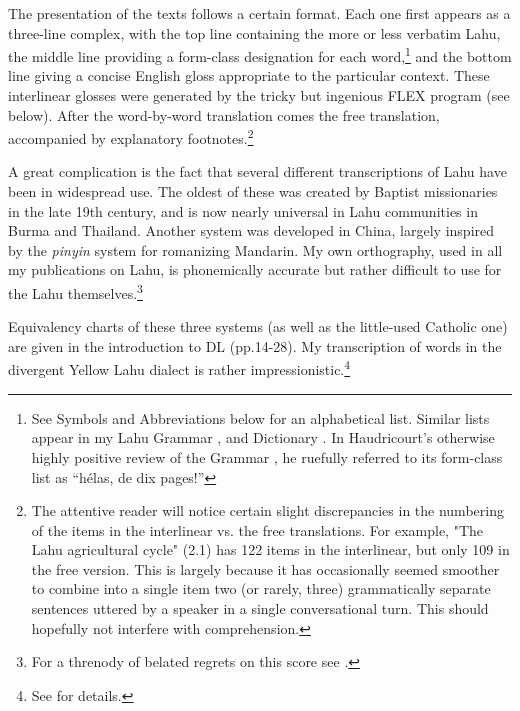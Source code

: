 The presentation of the texts follows a certain format. Each one first
appears as a three-line complex, with the top line containing the more
or less verbatim Lahu, the middle line providing a form-class
designation for each word,\footnote{See Symbols and Abbreviations
  below for an alphabetical list. Similar lists appear in my Lahu
  Grammar \citep[pp. xxviii- xxxvii]{matisoff1973grammar}, and
  Dictionary \citep[pp. xxi-xxiv]{88}. In Haudricourt's otherwise
  highly positive review of the Grammar \citep{h74}, he ruefully
  referred to its form-class list as ``hélas, de dix pages!''}  and
the bottom line giving a concise English gloss appropriate to the
particular context. These interlinear glosses were generated by the
tricky but ingenious FLEX program (see below). After the word-by-word
translation comes the free translation, accompanied by explanatory
footnotes.\footnote{
The attentive reader will notice certain slight discrepancies in
the numbering of the items in the interlinear vs. the free translations.
For example, "The Lahu agricultural cycle" (2.1) has 122 items in
the interlinear, but only 109 in the free version. This is largely because it has
occasionally seemed smoother to combine into a single item two
(or rarely, three) grammatically separate sentences uttered by a
speaker in a single conversational turn. This should hopefully not
interfere with comprehension.}

A great complication is the fact that several different transcriptions
of Lahu have been in widespread use. The oldest of these was created
by Baptist missionaries in the late 19th century, and is now nearly
universal in Lahu communities in Burma and Thailand. Another system
was developed in China, largely inspired by the \emph{pinyin} system for
romanizing Mandarin. My own orthography, used in all my publications
on Lahu, is phonemically accurate but rather difficult to use for the
Lahu themselves.\footnote{For a threnody of belated regrets on this score see
  \citet{matisoff2014}.}

Equivalency charts of these three systems (as well as the little-used
Catholic one) are given in the introduction to DL (pp.14-28). My
transcription of words in the divergent Yellow Lahu dialect is rather
impressionistic.\footnote{See \citet{matisoff1969lahu} for details.}

